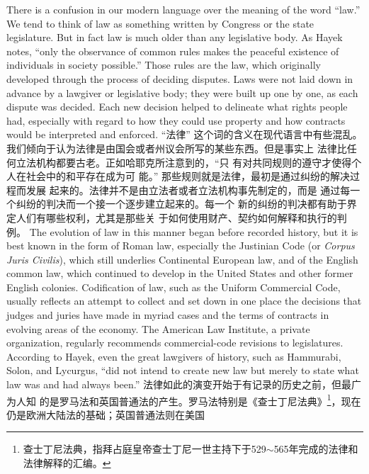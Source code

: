\begin{paracol}{2}

There is a confusion in our modern language over the meaning
of the word ``law.'' We tend to think of law as something written
by Congress or the state legislature. But in fact law is much
older than any legislative body. As Hayek notes, ``only the observance of common rules makes the peaceful existence of individuals in society possible.'' Those rules are the law, which
originally developed through the process of deciding disputes.
Laws were not laid down in advance by a lawgiver or legislative
body; they were built up one by one, as each dispute was decided. Each new decision helped to delineate what rights people
had, especially with regard to how they could use property and
how contracts would be interpreted and enforced.
\switchcolumn
“法律” 这个词的含义在现代语言中有些混乱。我们倾向于认为法律是由国会或者州议会所写的某些东西。但是事实上
法律比任何立法机构都要古老。正如哈耶克所注意到的，“只
有对共同规则的遵守才使得个人在社会中的和平存在成为可
能。” 那些规则就是法律，最初是通过纠纷的解决过程而发展
起来的。法律并不是由立法者或者立法机构事先制定的，而是
通过每一个纠纷的判决而一个接一个逐步建立起来的。每一个
新的纠纷的判决都有助于界定人们有哪些权利，尤其是那些关
于如何使用财产、契约如何解释和执行的判例。
\switchcolumn*
The evolution of law in this manner began before recorded
history, but it is best known in the form of Roman law, especially the Justinian Code (or \textit{Corpus Juris Civilis}), which still underlies Continental European law, and of the English common
law, which continued to develop in the United States and other
former English colonies. Codification of law, such as the Uniform Commercial Code, usually reflects an attempt to collect
and set down in one place the decisions that judges and juries
have made in myriad cases and the terms of contracts in evolving areas of the economy. The American Law Institute, a private
organization, regularly recommends commercial-code revisions
to legislatures. According to Hayek, even the great lawgivers of
history, such as Hammurabi, Solon, and Lycurgus, ``did not intend to create new law but merely to state what law was and
had always been.''
\switchcolumn
法律如此的演变开始于有记录的历史之前，但最广为人知
的是罗马法和英国普通法的产生。罗马法特别是《查士丁尼法典》\footnote{查士丁尼法典，指拜占庭皇帝查士丁尼一世主持下于529$\sim$565年完成的法律和法律解释的汇编。}，现在仍是欧洲大陆法的基础；英国普通法则在美国

\end{paracol}
